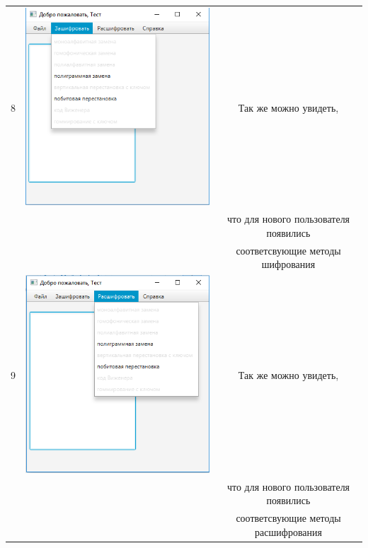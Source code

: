\documentclass[a4paper,12pt]{article}
\begin{document}
\begin{table}[pt!]
\begin{tabular}{|c|c|c|}
	8 & \includegraphics[scale=0.3]{img/database/main_open_methods.png} & Так же можно увидеть, \\ && что для нового пользователя появились\\ &&  соответсвующие методы шифрования\\
	\hline 
	9 & \includegraphics[scale=0.3]{img/database/main_open_methods2.png} & Так же можно увидеть, \\ && что для нового пользователя появились\\ &&  соответсвующие методы расшифрования\\
	\hline 
\end{tabular} 
\label{table:data_type2} 
\end{table}
\end{document}

